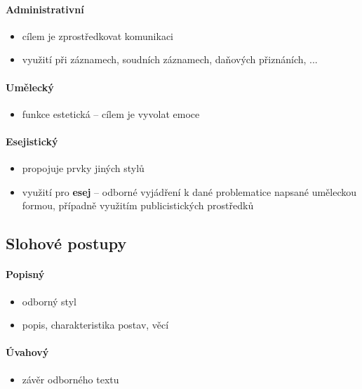 \paragraph{Administrativní}
\begin{itemize}
\item cílem je zprostředkovat komunikaci
\item využití při záznamech, soudních záznamech, daňových přiznáních, ...
\end{itemize}

\paragraph{Umělecký}
\begin{itemize}
\item funkce estetická -- cílem je vyvolat emoce
\end{itemize}

\paragraph{Esejistický}
\begin{itemize}
\item propojuje prvky jiných stylů
\item využití pro \textbf{esej} -- odborné vyjádření k dané problematice napsané uměleckou formou, případně využitím publicistických prostředků
\end{itemize}



\subsection{Slohové postupy}
\paragraph{Popisný}
\begin{itemize}
\item odborný styl
\item popis, charakteristika postav, věcí
\end{itemize}

\paragraph{Úvahový}
\begin{itemize}
\item závěr odborného textu
\end{itemize}


